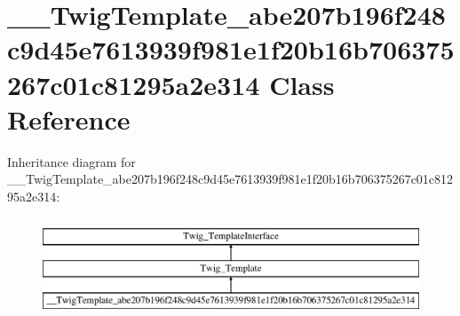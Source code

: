 \hypertarget{class_____twig_template__abe207b196f248c9d45e7613939f981e1f20b16b706375267c01c81295a2e314}{}\section{\+\_\+\+\_\+\+Twig\+Template\+\_\+abe207b196f248c9d45e7613939f981e1f20b16b706375267c01c81295a2e314 Class Reference}
\label{class_____twig_template__abe207b196f248c9d45e7613939f981e1f20b16b706375267c01c81295a2e314}
Inheritance diagram for \+\_\+\+\_\+\+Twig\+Template\+\_\+abe207b196f248c9d45e7613939f981e1f20b16b706375267c01c81295a2e314\+:\begin{figure}[H]
\begin{center}
\leavevmode
\includegraphics[height=3.000000cm]{class_____twig_template__abe207b196f248c9d45e7613939f981e1f20b16b706375267c01c81295a2e314}
\end{center}
\end{figure}
